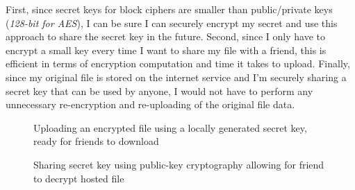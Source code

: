 \documentclass{article}
\begin{document}
First, since secret keys for block ciphers are smaller than public/private keys (\textit{128-bit for AES}), I can be sure I can securely encrypt my secret and use this approach to share the secret key in the future. Second, since I only have to encrypt a small key every time I want to share my file with a friend, this is efficient in terms of encryption computation and time it takes to upload. Finally, since my original file is stored on the internet service and I'm securely sharing a secret key that can be used by anyone, I would not have to perform any unnecessary re-encryption and re-uploading of the original file data. 
 
\begin{figure}[!htb]
        \caption{Uploading an encrypted file using a locally generated secret key, ready for friends to download}
\end{figure}

\begin{figure}[!htb]
        \caption{Sharing secret key using public-key cryptography allowing for friend to decrypt hosted file}
\end{figure}
\end{document}
